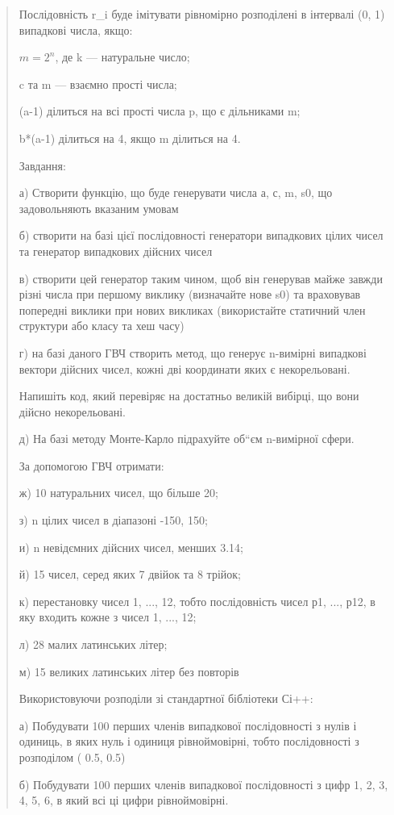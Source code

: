 \documentclass[]{article}
\begin{document}
\begin{quote}
Послідовність r\_i буде імітувати рівномірно розподілені в інтервалі (0,
1) випадкові числа, якщо:

\({m = 2}^{n}\), де k --- натуральне число;

c та m --- взаємно прості числа;

(a-1) ділиться на всі прості числа p, що є дільниками m;

b*(a-1) ділиться на 4, якщо m ділиться на 4.

Завдання:

а) Створити функцію, що буде генерувати числа а, с, m, s0, що
задовольняють вказаним умовам

б) створити на базі цієї послідовності генератори випадкових цілих чисел
та генератор випадкових дійсних чисел

в) створити цей генератор таким чином, щоб він генерував майже завжди
різні числа при першому виклику (визначайте нове s0) та враховував
попередні виклики при нових викликах (використайте статичний член
структури або класу та хеш часу)

г) на базі даного ГВЧ створить метод, що генерує n-вимірні випадкові
вектори дійсних чисел, кожні дві координати яких є некорельовані.

Напишіть код, який перевіряє на достатньо великій вибірці, що вони
дійсно некорельовані.

д) На базі методу Монте-Карло підрахуйте об``єм n-вимірної сфери.

За допомогою ГВЧ отримати:

ж) 10 натуральних чисел, що більше 20;

з) n цілих чисел в діапазоні -150, 150;

и) n не­відємних дійсних чисел, менших 3.14;

й) 15 чисел, серед яких 7 двійок та 8 трійок;

к) перестановку чисел 1, ..., 12, тобто послідовність чисел р1, ...,
р12, в яку входить кожне з чисел 1, ..., 12;

л) 28 малих латинських літер;

м) 15 великих латинських літер без повторів

Використовуючи розподіли зі стандартної бібліотеки Сі++:

а) Побудувати 100 перших членів випадкової послідовності з нулів і
одиниць, в яких нуль і одиниця рівноймовірні, тобто послідовності з
розподілом ( 0.5, 0.5)

б) Побудувати 100 перших членів випадкової послідовності з цифр 1, 2, 3,
4, 5, 6, в який всі ці цифри рівноймовірні.


\end{quote}
\end{document}
